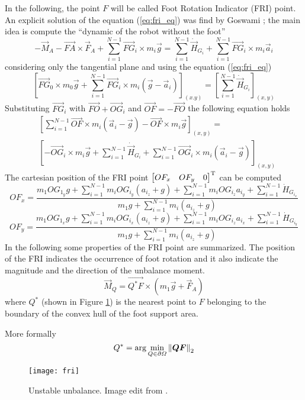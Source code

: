 In the following, the point $F$ will be called Foot Rotation Indicator (FRI) point.
An explicit solution of the equation (\ref{eq:fri_eq}) was find by Goswami \cite{Goswami1999};
the main idea is compute the ``dynamic of the robot without the foot''
\[
-\vec{M}_A - \vec{FA} \times \vec{F}_A + \sum_{i=1}^{N-1} {\vec{FG}_i \times m_i \vec{g}} = \sum_{i=1}^{N-1}
\dot{\vec{H}}_{G_i} + \sum_{i=1}^{N-1} {\vec{FG}_i \times m_i \vec{a}_i}
\]
considering only the tangential plane and using the equation (\ref{eq:fri_eq})
\[
\left[\vec{FG}_0 \times m_0 \vec{g} + \sum_{i=1}^{N-1}\vec{FG}_i \times m_i (\vec{g}-\vec{a}_i)\right]_{(x.y)} = \left[ \sum_{i=1}^{N-1} \dot{\vec{H}}_{G_i} \right]_{(x,y)}
\]
Substituting $\vec{FG}_i$ with $\vec{FO} + \vec{OG}_i$ and $\vec{OF} = -\vec{FO}$ the following
equation holds
\[
\begin{split}
  & \left[ \sum_{i=1}^{N-1} \vec{OF} \times m_i (\vec{a}_i - \vec{g}) -  \vec{OF} \times m_i \vec{g} \right]_{(x,y)} =\\
 & \left[ -\vec{OG}_i \times m_i \vec{g} + \sum_{i=1}^{N-1} \dot{\vec{H}}_{G_i} + \sum_{i=1}^{N-1} \vec{OG}_i \times m_i (\vec{a}_i - \vec{g})  \right]_{(x,y)}
\end{split}
\]
The cartesian position of the FRI point $\begin{bmatrix}OF_x & OF_y & 0 \end{bmatrix} ^{\mathrm{T}}$
can be computed
\[
OF_x = \frac{m_1 OG_{1_y} g + \sum_{i=1}^{N-1} m_i OG_{i_y}(a_{i_z} + g) + \sum_{i=1}^{N-1} m_i OG_{i_z} a_{i_y} + \sum_{i=1}^{N-1} \dot{H}_{G_{i_x}}}{m_1 g + \sum_{i=1}^{N-1} m_i ( a_{i_z} + g)}
\]
\[
OF_y = \frac{m_1 OG_{1_x} g + \sum_{i=1}^{N-1} m_i OG_{i_x}(a_{i_z} + g) + \sum_{i=1}^{N-1} m_i OG_{i_z} a_{i_x} + \sum_{i=1}^{N-1} \dot{H}_{G_{i_y}}}{m_1 g + \sum_{i=1}^{N-1} m_i ( a_{i_z} + g)}
\]
In the following some properties of the FRI point are summarized.
The position of the FRI indicates the occurrence of foot rotation and it also indicate the magnitude
and the direction of the unbalance moment.
\[
\vec{M}_{Q} = \vec{Q^*F} \times (m_1 \vec{g} + \vec{F}_A)
\]
where $Q^*$ (shown in Figure \ref{fig:fri}) is the nearest point to $F$  belonging to the boundary
of the convex hull of the foot support area.
\par
More formally
\[
Q^* = \arg \min_{Q \in \partial \Omega}\left\lVert\boldsymbol{QF}\right\rVert_2
\]
\begin{figure}[!ht]
  \centering
  \texttt{[image: fri]}
  \caption{Unstable unbalance. Image edit from \cite{Vukobratov2004}. \label{fig:fri}}
\end{figure}
